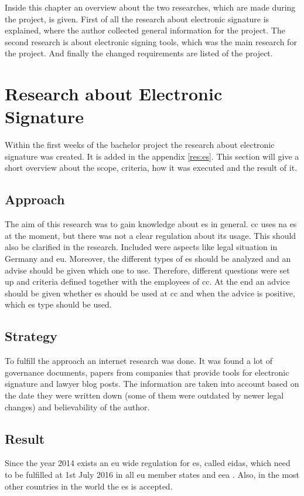 Inside this chapter an overview about the two researches, which are made during the project, is given. First of all the research about electronic signature is explained, where the author collected general information for the project. The second research is about electronic signing tools, which was the main research for the project. And finally the changed requirements are listed of the project.

\section{Research about Electronic Signature}
Within the first weeks of the bachelor project the research about electronic signature was created. It is added in the appendix \ref{res:es}. This section will give a short overview about the scope, criteria, how it was executed and the result of it.

\subsection{Approach}
The aim of this research was to gain knowledge about \gls{es} in general. \Gls{cc} uses na \gls{es} at the moment, but there was not a clear regulation about its usage. This should also be clarified in the research. Included were aspects like legal situation in Germany and \gls{eu}. Moreover, the different types of \gls{es} should be analyzed and an advise should be given which one to use. Therefore, different questions were set up and criteria defined together with the employees of \gls{cc}. At the end an advice should be given whether \gls{es} should be used at \gls{cc} and when the advice is positive, which \gls{es} type should be used.

\subsection{Strategy}
To fulfill the approach an internet research was done. It was found a lot of governance documents, papers from companies that provide tools for electronic signature and lawyer blog posts. The information are taken into account based on the date they were written down (some of them were outdated by newer legal changes) and believability of the author.


\subsection{Result}
Since the year 2014 exists an \gls{eu} wide regulation for \gls{es}, called \gls{eidas}, which need to be fulfilled at 1st July 2016 in all \gls{eu} member states and \gls{eea} \parencite{BundesministeriumInneren2018,Steffens2018eIDAS}. Also, in the most other countries in the world the \gls{es} is accepted. 

